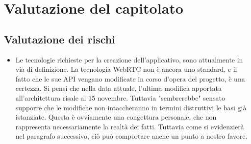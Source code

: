 \section{Valutazione del capitolato}

\subsection{Valutazione dei rischi}
\begin{itemize}
	\item Le tecnologie richieste per la creazione dell'applicativo, sono attualmente in via di definizione. La tecnologia WebRTC non è ancora uno standard, e il fatto che le sue API vengano modificate in corso d'opera del progetto, è una certezza. Si pensi che nella data attuale, l'ultima modifica apportata all'architettura risale al 15 novembre. Tuttavia "sembrerebbe" sensato supporre che le modifiche non intaccheranno in termini distruttivi le basi già istanziate. Questa è ovviamente una congettura personale, che non rappresenta necessariamente la realtà dei fatti. Tuttavia come  si evidenzierà nel paragrafo successivo, ciò può comportare anche un punto a nostro favore.
\end{itemize}

